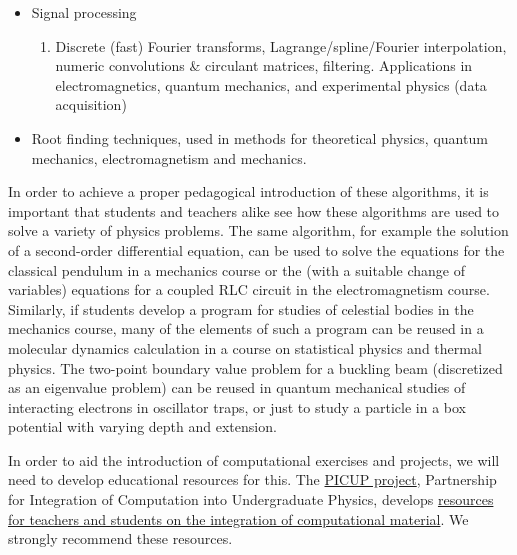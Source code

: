 \documentclass[%
oneside,                 %
final,                   %
10pt]{article}
\begin{document}
\begin{itemize}
\begin{enumerate}
\end{enumerate}

\noindent
 \item Signal processing
\begin{enumerate}

  \item Discrete (fast) Fourier transforms, Lagrange/spline/Fourier interpolation, numeric convolutions {\&} circulant matrices, filtering. Applications in electromagnetics, quantum mechanics, and experimental physics (data acquisition)

\end{enumerate}

\noindent
 \item Root finding techniques, used in methods for theoretical physics, quantum mechanics, electromagnetism and mechanics.
\end{itemize}

\noindent
In order to achieve a proper pedagogical introduction of these algorithms, it is important that students and teachers alike see how these algorithms are used to solve a variety of physics problems. The same algorithm, for example the solution of a second-order differential equation, can be used to solve the equations for the classical pendulum in a mechanics course or the (with a suitable change of variables) equations for a coupled RLC circuit in the electromagnetism course. Similarly, if students develop a program for studies of celestial bodies in the mechanics course, many of the elements of such a program can be reused in a molecular dynamics calculation in a course on statistical physics and thermal physics. The two-point boundary value problem for a buckling beam
(discretized as an eigenvalue problem) can be reused in quantum mechanical studies of interacting electrons in oscillator traps, or just to study a particle in a box potential with varying depth and extension. 

In order to aid the introduction of computational exercises and projects, we will need to develop educational resources for this. The \href{{http://www.compadre.org/picup/}}{PICUP project},  Partnership for Integration of Computation into Undergraduate Physics, develops \href{{http://www.compadre.org/PICUP/resources/}}{resources for teachers and students on the integration of computational  material}.   We strongly recommend these resources.
\end{document}
